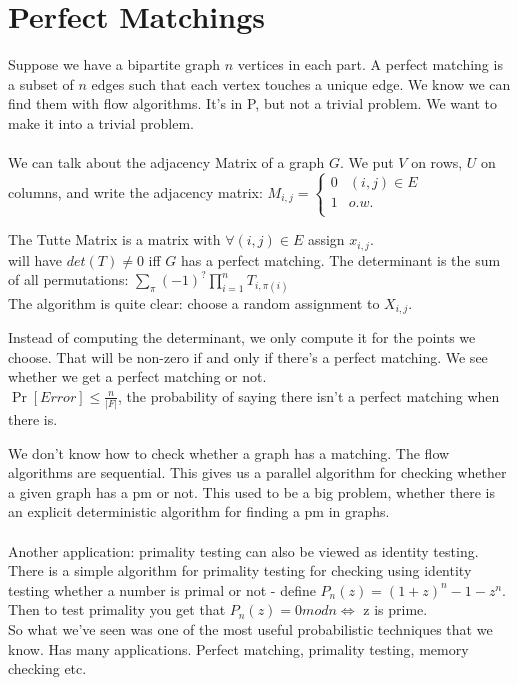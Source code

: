 \documentclass{article}
\begin{document}
\section{Perfect Matchings}
Suppose we have a bipartite graph $n$ vertices in each part. A perfect matching is a subset of $n$ edges such that each vertex touches a unique edge.
We know we can find them with flow algorithms. It's in P, but not a trivial problem. We want to make it into a trivial problem. \\\\
We can talk about the adjacency Matrix of a graph $G$. We put $V$ on rows, $U$ on columns, and write the adjacency matrix:  $M_{i,j}=\begin{cases}0 & (i,j)\in E \\
1 & o.w. \\
\end{cases}$

The Tutte Matrix is a matrix with $\forall (i,j)\in E$ assign $x_{i,j}$.\\
will have $det(T)\ne0$ iff $G$ has a perfect matching. 
The determinant is the sum of all permutations:
$\sum_{\pi}(-1)^{?}\prod_{i=1}^{n}T_{i,\pi(i)}$\\
The algorithm is quite clear: choose a random assignment to $X_{i,j}$. 

Instead of computing the determinant, we only compute it for the points we choose. That will be non-zero if and only if there's a perfect matching. We see whether we get a perfect matching or not. \\
$\Pr[Error]\le\frac{n}{|F|}$, the probability of saying there isn't a perfect matching when there is.

We don't know how to check whether a graph has a matching. The flow algorithms are sequential. This gives us a parallel algorithm for checking whether a given graph has a pm or not. This used to be a big problem, whether there is an explicit deterministic algorithm for finding a pm in graphs.\\\\

Another application: primality testing can also be viewed as identity testing. There is a simple algorithm for primality testing for checking using identity testing whether a number is primal or not - define 
$P_n(z)=(1+z)^{n}-1-z^n$. Then to test primality you get that 
$P_n(z)=0 mod n \iff$ z is prime.\\

So what we've seen was one of the most useful probabilistic techniques that we know. Has many applications. Perfect matching, primality testing, memory checking etc. 

 
\end{document}
